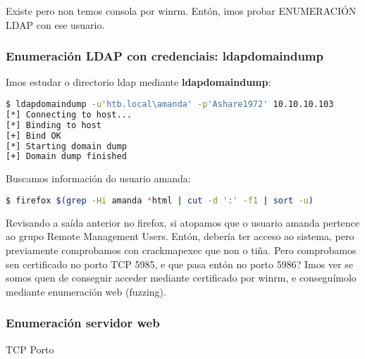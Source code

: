 \documentclass[a4paper]{article}
\begin{document}
Existe pero non temos consola por winrm. Entón, imos probar ENUMERACIÓN LDAP con ese usuario.

\subsubsection{Enumeración LDAP con credenciais: ldapdomaindump}
Imos estudar o directorio ldap mediante \textbf{ldapdomaindump}:
        \begin{lstlisting}[language=Bash, caption=ldapdomaindump]
$ ldapdomaindump -u'htb.local\amanda' -p'Ashare1972' 10.10.10.103
[*] Connecting to host...
[*] Binding to host
[+] Bind OK
[*] Starting domain dump
[+] Domain dump finished\end{lstlisting}             

\vspace*{-1cm}
Buscamos información do usuario amanda:
        \begin{lstlisting}[language=Bash, caption=Información sobre o usuario amanda]
$ firefox $(grep -Hi amanda *html | cut -d ':' -f1 | sort -u)\end{lstlisting}

\vspace*{-0.4cm}
Revisando a saída anterior no firefox, si atopamos que o usuario amanda pertence ao grupo Remote Management Users. Entón, debería ter acceso ao sistema, pero previamente comprobamos con crackmapexec que non o tiña. Pero comprobamos sen certificado no porto TCP 5985, e que pasa entón no porto 5986? Imos ver se somos quen de conseguir acceder mediante certificado por winrm, e conseguímolo mediante enumeración web (fuzzing).

        \subsubsection{Enumeración servidor web}
        \vspace{0.2cm}

        \begin{schema}{TCP}
        Porto
        \end{schema}
\end{document}

